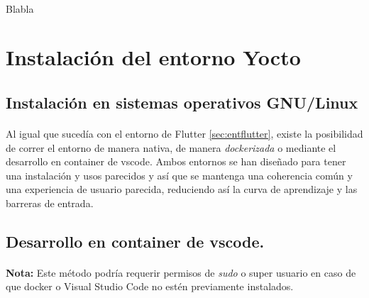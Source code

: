 \paragraph{}Blabla

\newpage

\section{Instalación del entorno Yocto}

\subsection{Instalación en sistemas operativos GNU/Linux}

\paragraph{}Al igual que sucedía con el entorno de Flutter \ref{sec:entflutter}, existe
la posibilidad de correr el entorno de manera nativa, de manera \emph{dockerizada} o
mediante el desarrollo en container de \gls{vscode}.
Ambos entornos se han diseñado para tener una instalación y usos parecidos y así que
se mantenga una coherencia común y una experiencia de usuario parecida, reduciendo así
la curva de aprendizaje y las barreras de entrada.

\subsection{Desarrollo en container de vscode.}

\paragraph{}\textbf{Nota:} Este método podría requerir permisos de \emph{sudo} o super
usuario en caso de que docker o Visual Studio Code no estén previamente instalados.

